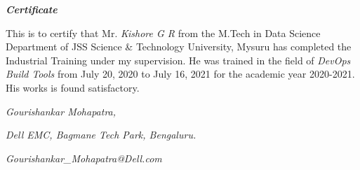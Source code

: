 \begin{center}
\emph{\LARGE\textbf {Certificate}}\\[2.5cm]
\end{center}


\doublespacing
This is to certify that Mr. \textit{Kishore G R} from the M.Tech in Data Science Department of JSS Science \& Technology University, Mysuru has completed the Industrial Training under my supervision. He was trained in the field of \textit{DevOps Build Tools} from July 20, 2020 to July 16, 2021 for the academic year 2020-2021. His works is found satisfactory. 

\vspace*{4cm}

\hfill \textit{Gourishankar Mohapatra,}\par
\hfill \textit{Dell EMC, Bagmane Tech Park, Bengaluru.}\par
\hfill \textit{Gourishankar\_Mohapatra@Dell.com}
